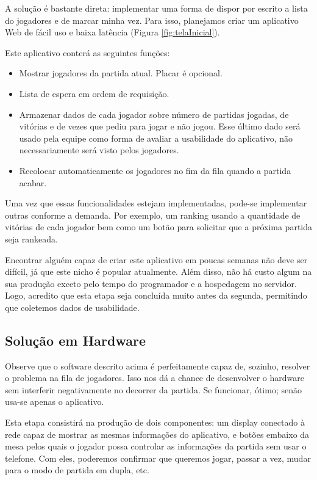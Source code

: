 \documentclass[12pt]{article}
\begin{document}
\begin{multicols}{2}
    A solução é bastante direta: implementar uma forma de dispor por escrito a lista do jogadores e de marcar minha vez. Para isso, planejamos criar um aplicativo Web de fácil uso e baixa latência (Figura \ref{fig:telaInicial}).

    Este aplicativo conterá as seguintes funções:
    \begin{itemize}
        \item Mostrar jogadores da partida atual. Placar é opcional.
        \item Lista de espera em ordem de requisição.
        \item Armazenar dados de cada jogador sobre número de partidas jogadas, de vitórias e de vezes que pediu para jogar e não jogou. Esse último dado será usado pela equipe como forma de avaliar a usabilidade do aplicativo, não necessariamente será visto pelos jogadores.
        \item Recolocar automaticamente os jogadores no fim da fila quando a partida acabar.
    \end{itemize}

    Uma vez que essas funcionalidades estejam implementadas, pode-se implementar outras conforme a demanda. Por exemplo, um ranking usando a quantidade de vitórias de cada jogador bem como um botão para solicitar que a próxima partida seja rankeada.

    Encontrar alguém capaz de criar este aplicativo em poucas semanas não deve ser difícil, já que este nicho é popular atualmente. Além disso, não há custo algum na sua produção exceto pelo tempo do programador e a hospedagem no servidor. Logo, acredito que esta etapa seja concluída muito antes da segunda, permitindo que coletemos dados de usabilidade.

\subsection{Solução em Hardware}
    Observe que o software descrito acima é perfeitamente capaz de, sozinho, resolver o problema na fila de jogadores. Isso nos dá a chance de desenvolver o hardware sem interferir negativamente no decorrer da partida. Se funcionar, ótimo; senão usa-se apenas o aplicativo.

    Esta etapa consistirá na produção de dois componentes: um display conectado à rede capaz de mostrar as mesmas informações do aplicativo, e botões embaixo da mesa pelos quais o jogador possa controlar as informações da partida sem usar o telefone. Com eles, poderemos confirmar que queremos jogar, passar a vez, mudar para o modo de partida em dupla, etc.


\end{multicols}
\end{document}
